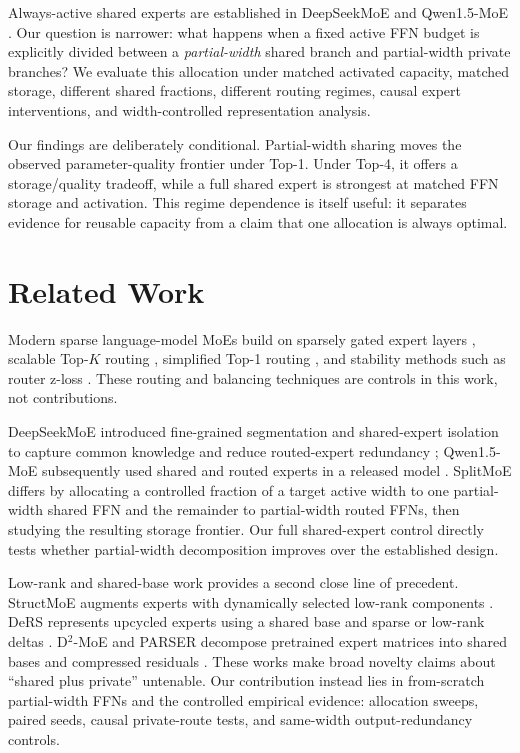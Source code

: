 \documentclass[10pt]{article}
\begin{document}
Always-active shared experts are established in DeepSeekMoE and Qwen1.5-MoE \citep{dai2024deepseekmoe,qwen2024moe}. Our question is narrower: what happens when a fixed active FFN budget is explicitly divided between a \emph{partial-width} shared branch and partial-width private branches? We evaluate this allocation under matched activated capacity, matched storage, different shared fractions, different routing regimes, causal expert interventions, and width-controlled representation analysis.

Our findings are deliberately conditional. Partial-width sharing moves the observed parameter-quality frontier under Top-1. Under Top-4, it offers a storage/quality tradeoff, while a full shared expert is strongest at matched FFN storage and activation. This regime dependence is itself useful: it separates evidence for reusable capacity from a claim that one allocation is always optimal.

\section{Related Work}
Modern sparse language-model MoEs build on sparsely gated expert layers \citep{shazeer2017outrageously}, scalable Top-$K$ routing \citep{lepikhin2020gshard}, simplified Top-1 routing \citep{fedus2022switch}, and stability methods such as router z-loss \citep{zoph2022stmoe}. These routing and balancing techniques are controls in this work, not contributions.

DeepSeekMoE introduced fine-grained segmentation and shared-expert isolation to capture common knowledge and reduce routed-expert redundancy \citep{dai2024deepseekmoe}; Qwen1.5-MoE subsequently used shared and routed experts in a released model \citep{qwen2024moe}. SplitMoE differs by allocating a controlled fraction of a target active width to one partial-width shared FFN and the remainder to partial-width routed FFNs, then studying the resulting storage frontier. Our full shared-expert control directly tests whether partial-width decomposition improves over the established design.

Low-rank and shared-base work provides a second close line of precedent. StructMoE augments experts with dynamically selected low-rank components \citep{sarwar2024structmoe}. DeRS represents upcycled experts using a shared base and sparse or low-rank deltas \citep{huang2025ders}. D$^2$-MoE and PARSER decompose pretrained expert matrices into shared bases and compressed residuals \citep{gu2025d2moe,jung2026parser}. These works make broad novelty claims about ``shared plus private'' untenable. Our contribution instead lies in from-scratch partial-width FFNs and the controlled empirical evidence: allocation sweeps, paired seeds, causal private-route tests, and same-width output-redundancy controls.
\end{document}

